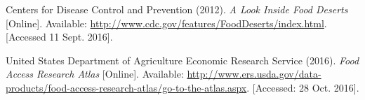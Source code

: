 \documentclass[12pt]{article}
\begin{document}
\pagebreak

\begin{thebibliography}{9}
    Centers for Disease Control and Prevention (2012).
    \textit{A Look Inside Food Deserts} [Online].
    Available: \url{http://www.cdc.gov/features/FoodDeserts/index.html}.
    [Accessed 11 Sept. 2016].

    United States Department of Agriculture Economic Research Service (2016).
    \textit{Food Access Research Atlas} [Online].
    Available:
    \url{http://www.ers.usda.gov/data-products/food-access-research-atlas/go-to-the-atlas.aspx}.
    [Accessed: 28 Oct. 2016].

\end{thebibliography}
\end{document}
